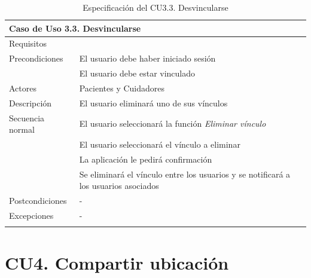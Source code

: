 \begin{longtable}{|p{} p{}|}
    \hline
    \multicolumn{2}{|l|}{\textbf{Caso de Uso 3.3. Desvincularse}} \\ \hline \hline
    Requisitos          & {req:borrar_vinculo} \\ \hline
    Precondiciones      & El usuario debe haber iniciado sesión \\
                        & El usuario debe estar vinculado \\ \hline
    Actores             & Pacientes y Cuidadores \\ \hline
    Descripción         & El usuario eliminará uno de sus vínculos \\ \hline
    Secuencia normal    & El usuario seleccionará la función \emph{Eliminar vínculo} \\
                        & El usuario seleccionará el vínculo a eliminar \\
                        & La aplicación le pedirá confirmación \\
                        & Se eliminará el vínculo entre los usuarios y se notificará a los usuarios asociados \\ \hline
    Postcondiciones     & - \\ \hline
    Excepciones         & - \\ \hline
    \caption{Especificación del CU3.3. Desvincularse}
    \label{cu:desvincular}
\end{longtable}

\section{CU4. Compartir ubicación}
\label{sec:cu:ubicacion}


